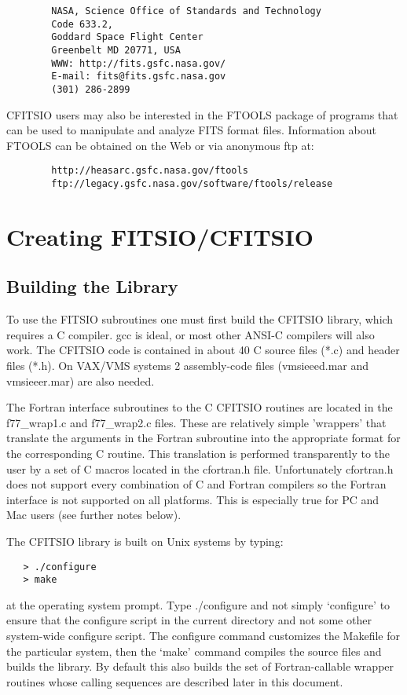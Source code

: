 \documentclass[11pt]{book}
\begin{document}
\begin{verbatim}
        NASA, Science Office of Standards and Technology
        Code 633.2,
        Goddard Space Flight Center
        Greenbelt MD 20771, USA
        WWW: http://fits.gsfc.nasa.gov/
        E-mail: fits@fits.gsfc.nasa.gov
        (301) 286-2899
\end{verbatim}
CFITSIO users may also be interested in the FTOOLS package of programs
that can be used to manipulate and analyze FITS format files.
Information about FTOOLS can be obtained on the Web or via anonymous
ftp at:

\begin{verbatim}
        http://heasarc.gsfc.nasa.gov/ftools
        ftp://legacy.gsfc.nasa.gov/software/ftools/release
\end{verbatim}

\chapter{ Creating FITSIO/CFITSIO }


\section{Building the Library}

To use the FITSIO subroutines one must first build the CFITSIO library,
which requires a C compiler. gcc is ideal, or most other ANSI-C
compilers will also work.  The CFITSIO code is contained in about 40 C
source files (*.c) and header files (*.h). On VAX/VMS systems 2
assembly-code files (vmsieeed.mar and vmsieeer.mar) are also needed.

The Fortran interface subroutines to the C CFITSIO routines are located
in the f77\_wrap1.c and f77\_wrap2.c files.  These are relatively simple
'wrappers' that translate the arguments in the Fortran subroutine into
the appropriate format for the corresponding C routine.  This
translation is performed transparently to the user by a set of C macros
located in the cfortran.h file.  Unfortunately cfortran.h does not
support every combination of C and Fortran compilers so the Fortran
interface is not supported on all platforms.  This is especially true
for PC and Mac users (see further notes below).

The CFITSIO library is built on Unix systems by typing:

\begin{verbatim}
   > ./configure
   > make
\end{verbatim}
at the operating system prompt.  Type ./configure and not simply
`configure' to ensure that the configure script in the current
directory and not some other system-wide configure script.  The
configure command customizes the Makefile for the particular system,
then the `make' command compiles the source files and builds the
library. By default this also builds the set of Fortran-callable
wrapper routines whose calling sequences are described later in this
document.
\end{document}
